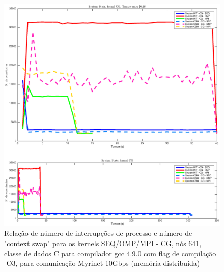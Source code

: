\documentclass[conference,compsoc]{IEEEtran}
\begin{document}
\begin{figure}[H]
\centering
\includegraphics[width=1.1\columnwidth]{EPS/dstat_CG_seq_vs_omp_vs_mpi/system.eps}
\caption{Relação de número de interrupções de processo e número de "context swap" para os kernels SEQ/OMP/MPI - CG, nós 641, classe de dados C para compilador gcc 4.9.0 com flag de compilação  -O3, para comunicação Myrinet 10Gbps (memória distribuída)}
\label{dstat_cg_SOM_system}
\end{figure}
\end{document}
